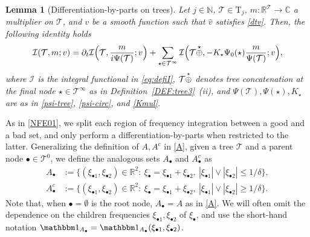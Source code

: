 \documentclass[a4paper,
11pt,  reqno]{amsart}
\makeatletter
\newcommand{\5}{\textup{V}}
\newcommand{\noi}{\noindent}
\newcommand{\ft}{\widehat}
\newcommand{\ind}{\mathbbm 1}
\newcommand{\les}{\lesssim}
\newcommand{\dt}{\partial_t}
\newtheorem{lemma}[theorem]{Lemma}
\theoremstyle{remark}
\newcommand{\R}{\mathbb{R}}
\newcommand{\bul}{\bullet}
\newcommand{\TT}{\mathcal{T}}
\newcommand{\Tr}{\mathrm{T}}
\newcommand{\N}{\mathbb{N}}
\def\<#1>{\csname MH@symb@#1\endcsname}
\newcommand{\Ical}{\mathcal{I}}
\numberwithin{equation}{section}
\numberwithin{theorem}{section}
\makeatother
\begin{document}
\begin{lemma}[Differentiation-by-parts on trees]
\label{LEM:IBP}
Let $j\in\N$, $\TT\in\Tr_j$, $m: \R^{\TT}\to \mathbb{C}$ a multiplier on $\TT$,
and $v$ be a smooth function such that $\ft v$ satisfies  \eqref{dtv}. Then, the following identity holds
\begin{align}\label{IBP}
\begin{split}
\Ical (\TT,m; v)
= \dt \Ical \Big(\TT,\frac{m}{ i \Psi(\TT)} ; v \Big)
+ \sum_{\star \in \TT^\infty} \Ical 
\Big(\TT \overset{\star}{\oplus} \<1>
, - K_\star \Psi_0(\star) \frac{m}{\Psi(\TT)} ; v \Big)
,
\end{split}
\end{align}
where $\Ical$ is the integral  functional in \eqref{eq:defiI}, $\TT \overset{\star}{\oplus} \<1> $ denotes tree concatenation at the final node $\star\in \TT^\infty$ as in Definition~\ref{DEF:tree3}~(ii), and $\Psi(\TT), \Psi(\star),  K_\star$ are as in \eqref{psi-tree}, \eqref{psi-circ}, and \eqref{Kmul}.

\end{lemma}



\noi
As in \eqref{NFE01}, we split each region of frequency integration between a good and a bad set, and only perform a differentiation-by-parts when restricted to the latter. Generalizing the definition of $A, A^c$ in \eqref{A}, given a tree $\TT$ and a parent node $\bul \in \TT^0$, we define the analogous sets $A_\bul$ and $A_\bul^c$ as
\begin{align}
A_\bul& 
:=
 \big\{ (\xi_{\bul1}, \xi_{\bul2}) \in \R^2: \ \xi_\bul =
\xi_{\bul1}
+ \xi_{\bul2}, \ |\xi_{\bul1}| \lor  |\xi_{\bul2}|  \le 1/\delta 
 \} , \\
A_\bul^c & := \big\{ (\xi_{\bul1}, \xi_{\bul2}) \in \R^2: \ \xi_\bul =
\xi_{\bul1} +
\xi_{\bul2},\
|\xi_{\bul1}| \lor |\xi_{\bul2}| \ge 1/\delta \big\} 
.
\label{defA}
\end{align}
Note that, when $\bul = \emptyset$ is the root node, $A_\bul =A$ as in \eqref{A}. 
We will often omit the dependence on the children frequencies $\xi_{\bul 1}, \xi_{\bul2}$ of $\xi_\bul$, and use the short-hand notation $\ind_{A_\bul}=\ind_{A_\bul} (\xi_{\bul1},\xi_{\bul2})$.
\end{document}
